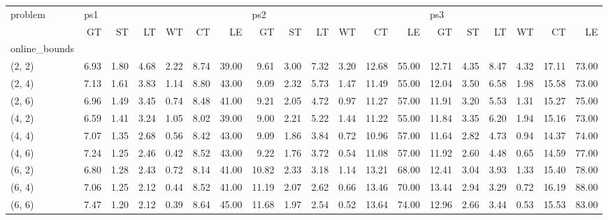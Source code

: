 \begin{tabular}{lrrrrrrrrrrrrrrrrrr}
\toprule
problem & \multicolumn{6}{l}{ps1} & \multicolumn{6}{l}{ps2} & \multicolumn{6}{l}{ps3} \\
{} &   GT &   ST &   LT &   WT &   CT &    LE &    GT &   ST &   LT &   WT &    CT &    LE &    GT &   ST &   LT &   WT &    CT &    LE \\
online\_bounds &      &      &      &      &      &       &       &      &      &      &       &       &       &      &      &      &       &       \\
\midrule
(2, 2)        & 6.93 & 1.80 & 4.68 & 2.22 & 8.74 & 39.00 &  9.61 & 3.00 & 7.32 & 3.20 & 12.68 & 55.00 & 12.71 & 4.35 & 8.47 & 4.32 & 17.11 & 73.00 \\
(2, 4)        & 7.13 & 1.61 & 3.83 & 1.14 & 8.80 & 43.00 &  9.09 & 2.32 & 5.73 & 1.47 & 11.49 & 55.00 & 12.04 & 3.50 & 6.58 & 1.98 & 15.58 & 73.00 \\
(2, 6)        & 6.96 & 1.49 & 3.45 & 0.74 & 8.48 & 41.00 &  9.21 & 2.05 & 4.72 & 0.97 & 11.27 & 57.00 & 11.91 & 3.20 & 5.53 & 1.31 & 15.27 & 75.00 \\
(4, 2)        & 6.59 & 1.41 & 3.24 & 1.05 & 8.02 & 39.00 &  9.00 & 2.21 & 5.22 & 1.44 & 11.22 & 55.00 & 11.84 & 3.35 & 6.20 & 1.94 & 15.16 & 73.00 \\
(4, 4)        & 7.07 & 1.35 & 2.68 & 0.56 & 8.42 & 43.00 &  9.09 & 1.86 & 3.84 & 0.72 & 10.96 & 57.00 & 11.64 & 2.82 & 4.73 & 0.94 & 14.37 & 74.00 \\
(4, 6)        & 7.24 & 1.25 & 2.46 & 0.42 & 8.52 & 43.00 &  9.22 & 1.76 & 3.72 & 0.54 & 11.08 & 57.00 & 11.92 & 2.60 & 4.48 & 0.65 & 14.59 & 77.00 \\
(6, 2)        & 6.80 & 1.28 & 2.43 & 0.72 & 8.14 & 41.00 & 10.82 & 2.33 & 3.18 & 1.14 & 13.21 & 68.00 & 12.41 & 3.04 & 3.93 & 1.33 & 15.40 & 78.00 \\
(6, 4)        & 7.06 & 1.25 & 2.12 & 0.44 & 8.52 & 41.00 & 11.19 & 2.07 & 2.62 & 0.66 & 13.46 & 70.00 & 13.44 & 2.94 & 3.29 & 0.72 & 16.19 & 88.00 \\
(6, 6)        & 7.47 & 1.20 & 2.12 & 0.39 & 8.64 & 45.00 & 11.68 & 1.97 & 2.54 & 0.52 & 13.64 & 74.00 & 12.96 & 2.66 & 3.44 & 0.53 & 15.53 & 83.00 \\
\bottomrule
\end{tabular}
